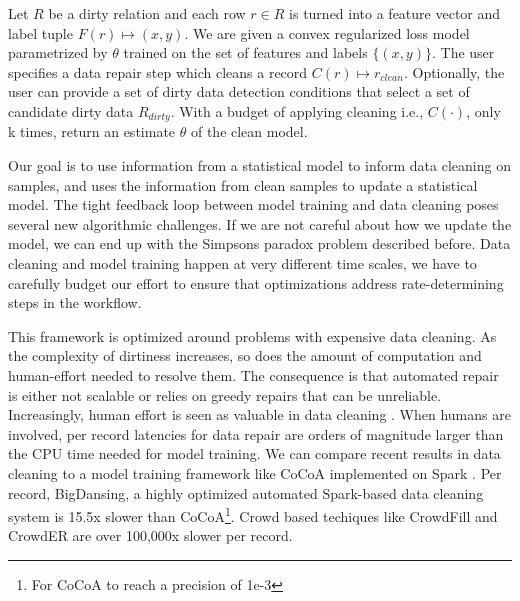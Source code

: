 \begin{problem}\label{activeclean}\sloppy
Let $R$ be a dirty relation and each row $r \in R$ is 
turned into a feature vector and label tuple $F(r) \mapsto (x,y)$.
We are given a convex regularized loss model parametrized
by $\theta$ trained on the set of features and labels $\{(x,y)\}$.
The user specifies a data repair step which cleans a record 
$C(r) \mapsto r_{clean}$.
Optionally, the user can provide a set of dirty data detection conditions that select 
a set of candidate dirty data $R_{dirty}$.
With a budget of applying cleaning i.e., $C(\cdot)$, only k times, return an estimate $\hat{\theta}$ of the clean model.
\end{problem}

Our goal is to use information from a statistical model to inform data cleaning on samples, and uses the information from clean samples to update a statistical model.
The tight feedback loop between model training and data cleaning poses several new algorithmic challenges. 
If we are not careful about how we update the model, we can end up with the Simpsons paradox problem described before.
Data cleaning and model training happen at very different time scales, we have to carefully budget our effort to ensure that optimizations address rate-determining steps in the workflow.

This framework is optimized around problems with expensive data cleaning.
As the complexity of dirtiness increases, so does the amount of computation and human-effort needed to resolve them.
The consequence is that automated repair is either not scalable or relies on greedy repairs that can be unreliable.
Increasingly, human effort is seen as valuable in data cleaning \cite{park2014crowdfill, wang2012crowder, gokhale2014corleone, wang1999sample}.
When humans are involved, per record latencies for data repair are orders of magnitude larger than the CPU time needed for model training.
We can compare recent results in data cleaning to a model training framework like CoCoA implemented on Spark \cite{jaggi2014communication}.
Per record, BigDansing, a highly optimized automated Spark-based data cleaning system is 15.5x slower than CoCoA\footnote{For CoCoA to reach a precision of 1e-3}.
Crowd based techiques like CrowdFill \cite{park2014crowdfill} and CrowdER \cite{wang2012crowder} are over 100,000x slower per record.

